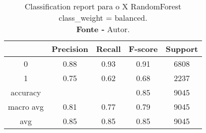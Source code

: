 % 
\begin{table}[H]
    \centering
    \begin{tabular}{@{}ccccc@{}}
    \toprule
     & \textbf{Precision} & \textbf{Recall} &\textbf{F-score} & \textbf{Support} \\ \midrule 
    0 & 0.88 & 0.93 & 0.91 & 6808 \\ 
    1 & 0.75 & 0.62 & 0.68 & 2237 \\ 
    accuracy &  &  & 0.85 & 9045 \\ 
    macro avg & 0.81 & 0.77 & 0.79 & 9045 \\ 
    avg & 0.85 & 0.85 & 0.85 & 9045 \\ \bottomrule
    \end{tabular}
    \caption{Classification report para o X RandomForest class\_weight = balanced. \\ \textbf{Fonte -} Autor.}
    \label{tab: classification-report-X RandomForest class_weight = balanced}
\end{table}